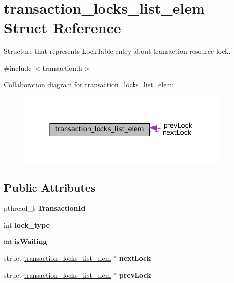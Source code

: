 \hypertarget{structtransaction__locks__list__elem}{}\section{transaction\+\_\+locks\+\_\+list\+\_\+elem Struct Reference}
\label{structtransaction__locks__list__elem}


Structure that represents Lock\+Table entry about transaction resource lock.  




{\ttfamily \#include $<$transaction.\+h$>$}



Collaboration diagram for transaction\+\_\+locks\+\_\+list\+\_\+elem\+:\nopagebreak
\begin{figure}[H]
\begin{center}
\leavevmode
\includegraphics[width=298pt]{structtransaction__locks__list__elem__coll__graph}
\end{center}
\end{figure}
\subsection*{Public Attributes}
\begin{DoxyCompactItemize}
\item 
\mbox{\label{structtransaction__locks__list__elem_a89663ab688fdc69536811ff376fc2ae1}} 
pthread\+\_\+t {\bfseries Transaction\+Id}
\item 
\mbox{\label{structtransaction__locks__list__elem_a27e32cb2ffe4dc6d09315686498b552c}} 
int {\bfseries lock\+\_\+type}
\item 
\mbox{\label{structtransaction__locks__list__elem_ab6ded356cab32f4bd04bd5993f4e9c53}} 
int {\bfseries is\+Waiting}
\item 
\mbox{\label{structtransaction__locks__list__elem_a80609433b1b31557377dd3489cc74c51}} 
struct \hyperlink{structtransaction__locks__list__elem}{transaction\+\_\+locks\+\_\+list\+\_\+elem} $\ast$ {\bfseries next\+Lock}
\item 
\mbox{\label{structtransaction__locks__list__elem_acafc0b84518b79c03b7ff9838dc7bb6e}} 
struct \hyperlink{structtransaction__locks__list__elem}{transaction\+\_\+locks\+\_\+list\+\_\+elem} $\ast$ {\bfseries prev\+Lock}
\end{DoxyCompactItemize}


